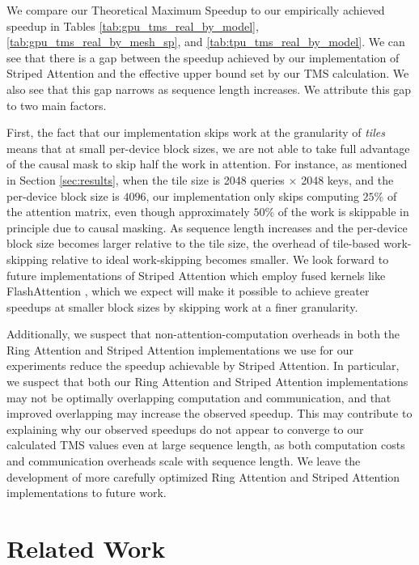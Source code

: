 We compare our Theoretical Maximum Speedup to our empirically achieved speedup in Tables \ref{tab:gpu_tms_real_by_model}, \ref{tab:gpu_tms_real_by_mesh_sp}, and \ref{tab:tpu_tms_real_by_model}. We can see that there is a gap between the speedup achieved by our implementation of Striped Attention and the effective upper bound set by our TMS calculation. We also see that this gap narrows as sequence length increases. We attribute this gap to two main factors.

First, the fact that our implementation skips work at the granularity of \emph{tiles} means that at small per-device block sizes, we are not able to take full advantage of the causal mask to skip half the work in attention. For instance, as mentioned in Section \ref{sec:results}, when the tile size is 2048 queries $\times$ 2048 keys, and the per-device block size is $4096$, our implementation only skips computing $25\%$ of the attention matrix, even though approximately $50\%$ of the work is skippable in principle due to causal masking. As sequence length increases and the per-device block size becomes larger relative to the tile size, the overhead of tile-based work-skipping relative to ideal work-skipping becomes smaller. We look forward to future implementations of Striped Attention which employ fused kernels like FlashAttention \cite{dao2023flashattention}, which we expect will make it possible to achieve greater speedups at smaller block sizes by skipping work at a finer granularity. 

Additionally, we suspect that non-attention-computation overheads in both the Ring Attention and Striped Attention implementations we use for our experiments reduce the speedup achievable by Striped Attention. In particular, we suspect that both our Ring Attention and Striped Attention implementations may not be optimally overlapping computation and communication, and that improved overlapping may increase the observed speedup. This may contribute to explaining why our observed speedups do not appear to converge to our calculated TMS values even at large sequence length, as both computation costs and communication overheads scale with sequence length. We leave the development of more carefully optimized Ring Attention and Striped Attention implementations to future work.

\section{Related Work}

